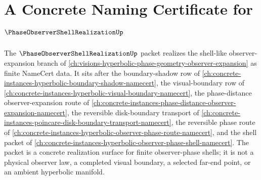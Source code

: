 \chapter{A Concrete Naming Certificate for $\PhaseObserverShellRealizationUp$}
\label{ch:concrete-instances-phase-observer-shell-realization-namecert}

The $\PhaseObserverShellRealizationUp$ packet realizes the shell-like observer-expansion branch of \autoref{ch:visions-hyperbolic-phase-geometry-observer-expansion} as finite NameCert data. It sits after the boundary-shadow row of \autoref{ch:concrete-instances-hyperbolic-boundary-shadow-namecert}, the visual-boundary row of \autoref{ch:concrete-instances-hyperbolic-visual-boundary-namecert}, the phase-distance observer-expansion route of \autoref{ch:concrete-instances-phase-distance-observer-expansion-namecert}, the reversible disk-boundary transport of \autoref{ch:concrete-instances-poincare-disk-boundary-transport-namecert}, the reversible phase route of \autoref{ch:concrete-instances-hyperbolic-observer-phase-route-namecert}, and the shell packet of \autoref{ch:concrete-instances-hyperbolic-observer-phase-shell-namecert}. The packet is a concrete realization surface for finite observer-phase shells; it is not a physical observer law, a completed visual boundary, a selected far-end point, or an ambient hyperbolic manifold.

